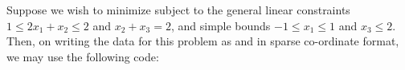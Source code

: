 \documentclass{galahad}
\begin{document}
\galexample
Suppose we wish to minimize
subject to the general linear constraints
$1 \leq  2 x_{1}  +  x_{2}  \leq  2$ and
$x_{2}  +  x_{3}  =  2$, and simple bounds
$-1  \leq  x_{1}  \leq  1$ and $x_{3}  \leq  2$.
Then, on writing the data for this problem as
and
in sparse co-ordinate format, we may use the following code:
\end{document}
